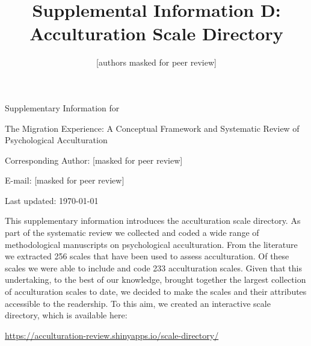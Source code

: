 \documentclass[man, 12pt, a4paper]{apa7}
\title{Supplemental Information D: Acculturation Scale Directory}
\author{[authors masked for peer review]}
\begin{document}
\begin{titlepage}
	{\noindent\Large Supplementary Information for \par}
	\vspace{0.5cm}
	{\noindent\Large The Migration Experience: A Conceptual Framework and Systematic Review of Psychological Acculturation\par}
	\vspace{1.5cm}
	{\noindent\LARGE\bfseries \thetitle \par}
	\vspace{2cm}
	{\noindent\Large\itshape \theauthor \par}
	\vfill
	\noindent Corresponding Author: [masked for peer review]\par
	\noindent E-mail: [masked for peer review]\par
	\vfill

	{\noindent Last updated: \today\par}
\end{titlepage}

\begin{center}
   \textbf{\thetitle} 
\end{center}

This supplementary information introduces the acculturation scale directory. As part of the systematic review we collected and coded a wide range of methodological manuscripts on psychological acculturation. From the literature we extracted 256 scales that have been used to assess acculturation. Of these scales we were able to include and code 233 acculturation scales. Given that this undertaking, to the best of our knowledge, brought together the largest collection of acculturation scales to date, we decided to make the scales and their attributes accessible to the readership. To this aim, we created an interactive scale directory, which is available here:

\vspace{.5cm}
\begin{tcolorbox}
    \vspace{0.2cm} \centering 
    \href{https://acculturation-review.shinyapps.io/scale-directory/}{https://acculturation-review.shinyapps.io/scale-directory/}
    \vspace{0.2cm} 
\end{tcolorbox}
\end{document}
